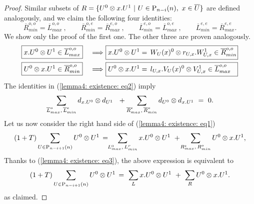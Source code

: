 \begin{proof}
	\vspace*{5pt}
	Similar subsets of $R = \{U^0\otimes x.U^1\ | \ U \in \mathrm{P}_{n-i}(n),\ x \in \overline{U}\}$ are defined analogously, and we claim the following four identities:
	\begin{equation}\label{lemma4: existence: eq2}
	\overline{R}_{min}^{o,o} = \overline{L}_{max}^{o,o}\ , \qquad \overline{R}_{min}^{o,e} = \overline{R}_{max}^{e,o}\ , \qquad
	\overline{L}_{min}^{e,o} = \overline{L}_{max}^{o,e}\ , \qquad \overline{L}_{min}^{e,e} = \overline{R}_{max}^{e,e}.
	\end{equation}
	We show only the proof of the first one. The other three are proven analogously.
	\begin{alignat*}{2}
	&\boxed{x.U^0\ot U^1 \in \overline{L}_{max}^{o,o}}\ &\Longrightarrow\ &\boxed{x.U^0\ot U^1 =\, W_U(x)^0\ot r_{U,x}.W_{U,x}^1 \in \overline{R}_{min}^{o,o} \! } \\
	&\boxed{U^0\ot x.U^1 \in \overline{R}_{min}^{o,o}}\ &\Longrightarrow\ &\boxed{U^0\ot x.U^1 =\, l_{U,x}.V_U(x)^0\ot V_{U,x}^1 \in \overline{L}_{max}^{o,o} \ \ }
	\end{alignat*}
	The identities in (\ref{lemma4: existence: eq2}) imply
	\begin{equation} \label{lemma4: existence: eq3}
	\sum_{\overline{L}_{max}^{o},\, \overline{L}_{min}^{e}} d_{x.U^0} \otimes d_{U^1}\ \ +
	\sum_{\overline{R}_{max}^{e},\, \overline{R}_{min}^{o}} d_{U^0} \otimes d_{x.U^1}\ =\ 0.
	\end{equation}
	Let us now consider the right hand side of (\ref{lemma4: existence: eq1})
	\[
	(1+T) \sum_{U \in \mathrm{P}_{n-i+1}(n)} {U^0} \otimes {U^1} \, = \!\!
	\sum_{L^0_{max},\, L^r_{min}} {x.U^0} \otimes {U^1}\ + \!
	\sum_{R^e_{max}, \, R^o_{min}} {U^0} \otimes {x.U^1,}
	\]
	Thanks to (\ref{lemma4: existence: eq3}), the above expression is equivalent to
	\[
	(1+T) \sum_{U \in \mathrm{P}_{n-i+1}(n)} {U^0} \otimes {U^1} \, = \
	\sum_{L} {x.U^0} \otimes {U^1}\ + \
	\sum_{R} {U^0} \otimes {x.U^1.}
	\]
	as claimed.
\end{proof}

%
